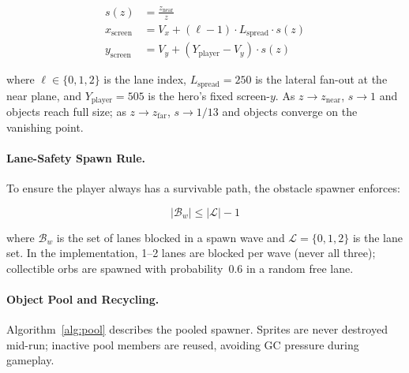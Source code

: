 \documentclass[runningheads]{llncs}
\begin{document}
\begin{align}
  s(z)          &= \frac{z_{\text{near}}}{z} \label{eq:projscale} \\
  x_{\text{screen}} &= V_x + (\ell - 1) \cdot L_{\text{spread}} \cdot s(z) \label{eq:screenx} \\
  y_{\text{screen}} &= V_y + (Y_{\text{player}} - V_y) \cdot s(z) \label{eq:screeny}
\end{align}

\noindent where $\ell \in \{0,1,2\}$ is the lane index, $L_{\text{spread}} = 250$ is
the lateral fan-out at the near plane, and $Y_{\text{player}} = 505$ is the
hero's fixed screen-$y$. As $z \to z_{\text{near}}$, $s \to 1$ and objects
reach full size; as $z \to z_{\text{far}}$, $s \to 1/13$ and objects converge
on the vanishing point.

\paragraph{Lane-Safety Spawn Rule.}
To ensure the player always has a survivable path, the obstacle spawner
enforces:

\begin{equation}
  |\mathcal{B}_w| \leq |\mathcal{L}| - 1
  \label{eq:lanesafe}
\end{equation}

\noindent where $\mathcal{B}_w$ is the set of lanes blocked in a spawn wave and
$\mathcal{L} = \{0,1,2\}$ is the lane set. In the implementation, 1--2
lanes are blocked per wave (never all three); collectible orbs are spawned
with probability~0.6 in a random free lane.

\paragraph{Object Pool and Recycling.}
Algorithm~\ref{alg:pool} describes the pooled spawner. Sprites are never
destroyed mid-run; inactive pool members are reused, avoiding GC pressure
during gameplay.
\end{document}
